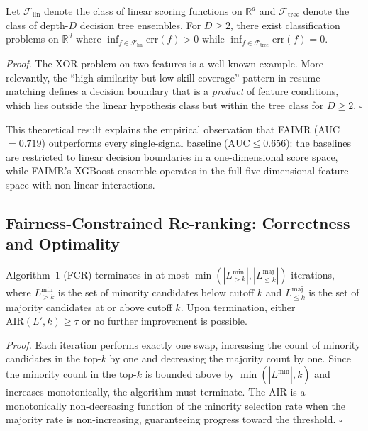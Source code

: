 \documentclass{llncs}
\begin{document}
\begin{theorem}\label{thm:express}
Let $\mathcal{F}_\text{lin}$ denote the class of linear scoring functions on $\mathbb{R}^d$ and $\mathcal{F}_\text{tree}$ denote the class of depth-$D$ decision tree ensembles. For $D \geq 2$, there exist classification problems on $\mathbb{R}^d$ where $\inf_{f \in \mathcal{F}_\text{lin}} \text{err}(f) > 0$ while $\inf_{f \in \mathcal{F}_\text{tree}} \text{err}(f) = 0$.
\end{theorem}

\textit{Proof.} The XOR problem on two features is a well-known example. More relevantly, the ``high similarity but low skill coverage'' pattern in resume matching defines a decision boundary that is a \textit{product} of feature conditions, which lies outside the linear hypothesis class but within the tree class for $D \geq 2$. \hfill $\square$

This theoretical result explains the empirical observation that FAIMR (AUC~$= 0.719$) outperforms every single-signal baseline ($\text{AUC} \leq 0.656$): the baselines are restricted to linear decision boundaries in a one-dimensional score space, while FAIMR's XGBoost ensemble operates in the full five-dimensional feature space with non-linear interactions.

\subsection{Fairness-Constrained Re-ranking: Correctness and Optimality}\label{sec:fcr_theory}

\begin{theorem}\label{thm:fcr}
Algorithm~1 (FCR) terminates in at most $\min(|L_{>\!k}^{\text{min}}|, |L_{\leq k}^{\text{maj}}|)$ iterations, where $L_{>\!k}^{\text{min}}$ is the set of minority candidates below cutoff $k$ and $L_{\leq k}^{\text{maj}}$ is the set of majority candidates at or above cutoff $k$. Upon termination, either $\mathrm{AIR}(L', k) \geq \tau$ or no further improvement is possible.
\end{theorem}

\textit{Proof.} Each iteration performs exactly one swap, increasing the count of minority candidates in the top-$k$ by one and decreasing the majority count by one. Since the minority count in the top-$k$ is bounded above by $\min(|L^{\text{min}}|, k)$ and increases monotonically, the algorithm must terminate. The AIR is a monotonically non-decreasing function of the minority selection rate when the majority rate is non-increasing, guaranteeing progress toward the threshold. \hfill $\square$
\end{document}
